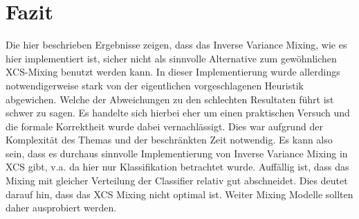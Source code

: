 \documentclass{ocsmnar}
\begin{document}
\section{Fazit}
Die hier beschrieben Ergebnisse zeigen, dass das Inverse Variance Mixing, wie es hier implementiert ist, sicher nicht als sinnvolle Alternative zum gewöhnlichen XCS-Mixing benutzt werden kann. In dieser Implementierung wurde allerdings notwendigerweise stark von der eigentlichen vorgeschlagenen Heuristik abgewichen. Welche der Abweichungen zu den schlechten Resultaten führt ist schwer zu sagen. 
Es handelte sich hierbei eher um einen praktischen Versuch und die formale Korrektheit wurde dabei vernachlässigt. Dies war aufgrund der Komplexität des Themas und der beschränkten Zeit notwendig. Es kann also sein, dass es durchaus sinnvolle Implementierung von Inverse Variance Mixing in XCS gibt, v.a. da hier nur Klassifikation betrachtet wurde. 
Auffällig ist, dass das Mixing mit gleicher Verteilung der Classifier relativ gut abschneidet. Dies deutet darauf hin, dass das XCS Mixing nicht optimal ist. Weiter Mixing Modelle sollten daher ausprobiert werden.  





\end{document}
